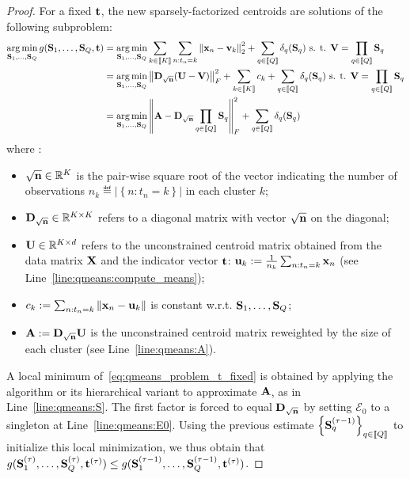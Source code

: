 \begin{proof}
For a fixed ${\mathbf{t}}$, the new sparsely-factorized centroids are solutions of the following subproblem:
%
\begin{align}
 \operatorname*{arg\,min}_{{\mathbf{S}}_1, \ldots,{\mathbf{S}}_Q} g({\mathbf{S}}_1, \ldots,{\mathbf{S}}_Q, {\mathbf{t}}) 
 & = \operatorname*{arg\,min}_{{\mathbf{S}}_1, \ldots,{\mathbf{S}}_Q} \sum_{k\in\left \llbracket K\right \rrbracket}  \sum_{n: t_n = k} \left \| {\mathbf{x}}_n - {\mathbf{v}}_k\right \|^2_2 + \sum_{q\in\left \llbracket Q\right \rrbracket} \delta_q({\mathbf{S}}_q) 
 \text{ s. t. } {\mathbf{V}} = \prod_{q\in\left \llbracket Q\right \rrbracket}{{\mathbf{S}}_q} \nonumber \\
 & = \operatorname*{arg\,min}_{{\mathbf{S}}_1, \ldots,{\mathbf{S}}_Q} \left \| {\mathbf{D}}_{\sqrt{{\mathbf{n}}}} ({\mathbf{U}} - {\mathbf{V}})\right \|_F^2
 + \sum_{k\in\left \llbracket K\right \rrbracket} c_k + \sum_{q\in\left \llbracket Q\right \rrbracket} \delta_q({\mathbf{S}}_q)
 \text{ s. t. } {\mathbf{V}} = \prod_{q\in\left \llbracket Q\right \rrbracket}{{\mathbf{S}}_q} \nonumber\\
  & = \operatorname*{arg\,min}_{{\mathbf{S}}_1, \ldots,{\mathbf{S}}_Q} \left \| {\mathbf{A}} - {\mathbf{D}}_{\sqrt{{\mathbf{n}}}} \prod_{q\in\left \llbracket Q\right \rrbracket}{{\mathbf{S}}_q}\right \|_F^2
 + \sum_{q\in\left \llbracket Q\right \rrbracket} \delta_q({\mathbf{S}}_q)
 \label{eq:qmeans_problem_t_fixed}
\end{align}
%
where :
%
\begin{itemize}
 \item $\sqrt{{\mathbf{n}}} \in \mathbb{R}^{K}$ is the pair-wise square root of the vector indicating the number of observations $n_k \eqdef \left | \left \lbrace n: t_n = k\right \rbrace \right |$  in each cluster $k$;
 \item ${\mathbf{D}}_{\sqrt{{\mathbf{n}}}} \in \mathbb{R}^{K \times K}$ refers to a diagonal matrix with vector $\sqrt{{\mathbf{n}}}$ on the diagonal;
 \item ${\mathbf{U}}\in \mathbb{R}^{K \times d}$ refers to the unconstrained centroid matrix obtained from the data matrix ${\mathbf{X}}$ and the indicator vector ${\mathbf{t}}$: ${\mathbf{u}}_k := \frac{1}{n_k}\sum_{n:t_n = k} {{\mathbf{x}}_n}$ (see Line~\ref{line:qmeans:compute_means});
 \item $c_k := \sum_{n: t_n = k}\left \| {\mathbf{x}}_n - {\mathbf{u}}_k\right \|$ is constant w.r.t. $ {\mathbf{S}}_1, \ldots,{\mathbf{S}}_Q$;
 \item ${\mathbf{A}} := {\mathbf{D}}_{\sqrt{{\mathbf{n}}}} {\mathbf{U}}$ is the unconstrained centroid matrix reweighted by the size of each cluster (see Line~\ref{line:qmeans:A}).
\end{itemize}

A local minimum of~\eqref{eq:qmeans_problem_t_fixed} is obtained by applying the \palm algorithm or its hierarchical variant to approximate ${\mathbf{A}}$, as in Line~\ref{line:qmeans:S}. The first factor is forced to equal ${\mathbf{D}}_{\sqrt{{\mathbf{n}}}}$ by setting $\mathcal{E}_0$ to a singleton at Line~\ref{line:qmeans:E0}. Using the previous estimate $\left \lbrace {\mathbf{S}}_q^{(\tau-1)}\right \rbrace_{q\in\left \llbracket Q\right \rrbracket}$ to initialize this local minimization, we thus obtain that $g({\mathbf{S}}_1^{(\tau)}, \ldots,{\mathbf{S}}_Q^{(\tau)}, {\mathbf{t}}^{(\tau)}) \leq g({\mathbf{S}}_1^{(\tau-1)}, \ldots,{\mathbf{S}}_Q^{(\tau-1)}, {\mathbf{t}}^{(\tau)})$.


\end{proof}
